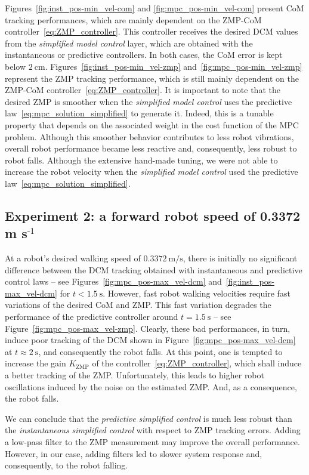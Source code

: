 Figures~\ref{fig:inst_pos-min_vel-com} and \ref{fig:mpc_pos-min_vel-com} present CoM tracking performances, which are mainly dependent on the ZMP-CoM controller~\eqref{eq:ZMP_controller}. This controller receives the desired DCM values from the \emph{simplified model control} layer, which are obtained with the instantaneous or predictive controllers. In both cases, the CoM error is kept below $\SI{2}{\centi \meter}$. Figures~\ref{fig:inst_pos-min_vel-zmp} and~\ref{fig:mpc_pos-min_vel-zmp} represent the ZMP tracking performance, which is still mainly dependent on the ZMP-CoM controller~\eqref{eq:ZMP_controller}. It is important to note that the desired ZMP is smoother when the \emph{simplified model control} uses the predictive law~\eqref{eq:mpc_solution_simplified} to generate it. Indeed, this is a tunable property that depends on the associated weight in the cost function of the MPC problem. Although this smoother behavior contributes to less robot vibrations, overall robot performance became less reactive and, consequently, less robust to robot falls. Although the extensive hand-made tuning, we were not able to increase the robot velocity when the \emph{simplified model control} used the predictive law~\eqref{eq:mpc_solution_simplified}. 

\subsection{Experiment 2: a forward robot speed of 0.3372 m s$^{\text{-1}}$}
At a robot's desired walking speed of $\SI{0.3372}{\meter \per \second}$, there is initially no significant difference between the DCM tracking obtained with instantaneous and predictive control laws -- see Figures~\ref{fig:mpc_pos-max_vel-dcm} and~\ref{fig:inst_pos-max_vel-dcm} for $t < \SI{1.5}{\second}$. However, fast robot walking velocities require fast variations of the desired CoM and ZMP. This fast variation degrades the performance of the predictive controller around $t = \SI{1.5}{\second}$ -- see Figure~\ref{fig:mpc_pos-max_vel-zmp}. Clearly, these bad performances, in turn, induce poor tracking of the DCM shown in Figure~\ref{fig:mpc_pos-max_vel-dcm} at $t\approx \SI{2}{\second}$, and consequently the robot falls. At this point, one is tempted to increase the gain $K_\text{ZMP}$ of the controller~\eqref{eq:ZMP_controller}, which shall induce a better tracking of the ZMP. Unfortunately, this leads to higher robot oscillations induced by the noise on the estimated ZMP. And, as a consequence, the robot falls. 

We can conclude that the \emph{predictive simplified control} is much less robust than the \emph{instantaneous simplified control} with respect to ZMP tracking errors. Adding a low-pass filter to the ZMP measurement may improve the overall performance. However, in our case, adding filters led to slower system response and, consequently, to the robot falling.


